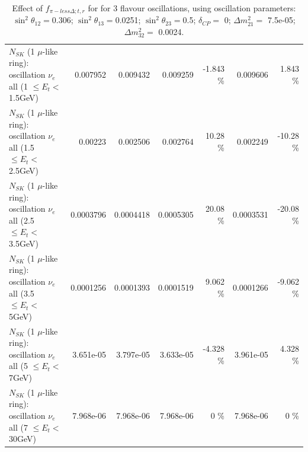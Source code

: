 \begin{table}
\begin{tabular}{| l | r | r | r  r | r  r |}
$N_{SK}$ (1 $\mu$-like ring): oscillation $\nu_{e}$ all (1 $\leq E_{t} <$ 1.5GeV) &        0.007952 &        0.009432 &        0.009259 &   -1.843 \%  &        0.009606 &    1.843 \%  \\ 
$N_{SK}$ (1 $\mu$-like ring): oscillation $\nu_{e}$ all (1.5 $\leq E_{t} <$ 2.5GeV) &         0.00223 &        0.002506 &        0.002764 &    10.28 \%  &        0.002249 &   -10.28 \%  \\ 
$N_{SK}$ (1 $\mu$-like ring): oscillation $\nu_{e}$ all (2.5 $\leq E_{t} <$ 3.5GeV) &       0.0003796 &       0.0004418 &       0.0005305 &    20.08 \%  &       0.0003531 &   -20.08 \%  \\ 
$N_{SK}$ (1 $\mu$-like ring): oscillation $\nu_{e}$ all (3.5 $\leq E_{t} <$ 5GeV) &       0.0001256 &       0.0001393 &       0.0001519 &    9.062 \%  &       0.0001266 &   -9.062 \%  \\ 
 $N_{SK}$ (1 $\mu$-like ring): oscillation $\nu_{e}$ all (5 $\leq E_{t} <$ 7GeV) &       3.651e-05 &       3.797e-05 &       3.633e-05 &   -4.328 \%  &       3.961e-05 &    4.328 \%  \\ 
$N_{SK}$ (1 $\mu$-like ring): oscillation $\nu_{e}$ all (7 $\leq E_{t} <$ 30GeV) &       7.968e-06 &       7.968e-06 &       7.968e-06 &        0 \%  &       7.968e-06 &        0 \%  \\ 
\hline
\hline
\end{tabular}
\caption{ Effect of $f_{\pi-less\Delta; t, r}$ for for 3 flavour oscillations, using oscillation parameters:  $\sin^2\theta_{12} = $0.306; $\sin^2\theta_{13} = $0.0251; $\sin^2\theta_{23} = $0.5; $\delta_{CP} = $        0; $\Delta m^2_{21} = $    7.5e-05; $\Delta m^2_{32} = $    0.0024. }
\label{tab:num_xsec_pilessdelta_1RmuT_3f_osc_t13:0.0251}
\end{table}
\clearpage
